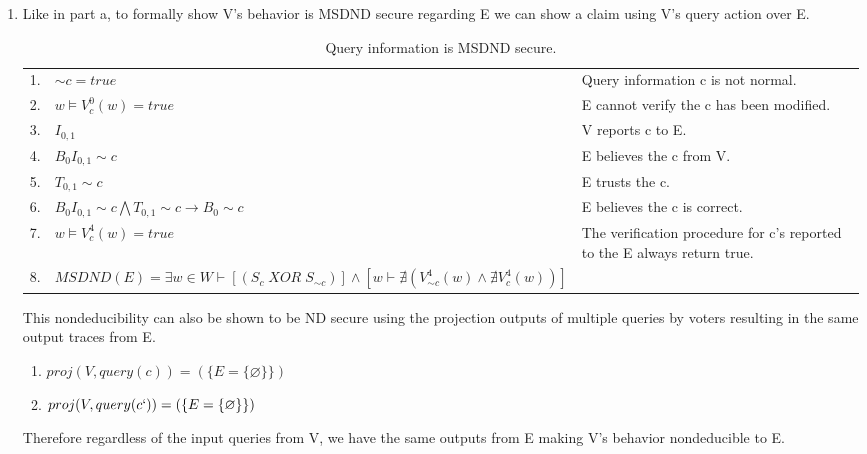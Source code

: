 \documentclass[journal,onecolumn]{IEEEtran}
\begin{document}
\begin{enumerate}
\begin{enumerate}
      \item Like in part a, to formally show V's behavior is MSDND secure regarding E we can show a claim using V's query action over E.  
      
      \begin{table}[H]
        \caption{Query information is MSDND secure.}
        \centering
        \begin{tabular}{lll}
        1.  & ${\sim} c = true$           & Query information c is not normal.                                                       \\
        2.  & $w \vDash V^0_c(w) = true$  & E cannot verify the c has been modified.                                 \\
        3.  & $I_{0,1}$                   & V reports c to E.                                                \\
        4.  & $B_0I_{0,1} {\sim} c$       & E believes the c from V.                                     \\
        5.  & $T_{0,1} {\sim} c$          & E trusts the c.                                                          \\
        6.  & $B_0I_{0,1} {\sim} c \bigwedge T_{0,1} {\sim} c \rightarrow B_0 {\sim} c$ & E believes the c is correct.                                             \\
        7.  & $w \vDash V^4_c(w) = true$   & The verification procedure for c's reported to the E always return true.\\
        8.  & $MSDND (E) = \exists w \in W \vdash [(S_{c} \; {XOR} \; S_{\sim c})] \wedge [w \vdash \nexists (V_{\sim c}^4 (w) \wedge \nexists V_{c}^4 (w))]$ & 
        \end{tabular}
      \end{table}
      
      This nondeducibility can also be shown to be ND secure using the projection outputs of multiple queries by voters resulting in the same output traces from E. \\

      \begin{enumerate}
        \item $proj(V, query(c)) = (\{E = \{\varnothing\}\})$       
        \item $proj(V, query(c`)) = (\{E = \{\varnothing\}\})$
      \end{enumerate}

      Therefore regardless of the input queries from V, we have the same outputs from E making V's behavior nondeducible to E.


\end{enumerate}
\end{enumerate}
\end{document}
